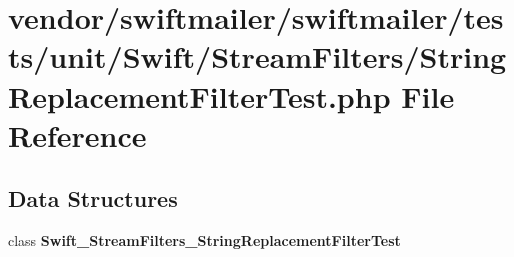 \section{vendor/swiftmailer/swiftmailer/tests/unit/\+Swift/\+Stream\+Filters/\+String\+Replacement\+Filter\+Test.php File Reference}
\label{_string_replacement_filter_test_8php}
\subsection*{Data Structures}
\begin{DoxyCompactItemize}
\item 
class {\bf Swift\+\_\+\+Stream\+Filters\+\_\+\+String\+Replacement\+Filter\+Test}
\end{DoxyCompactItemize}
